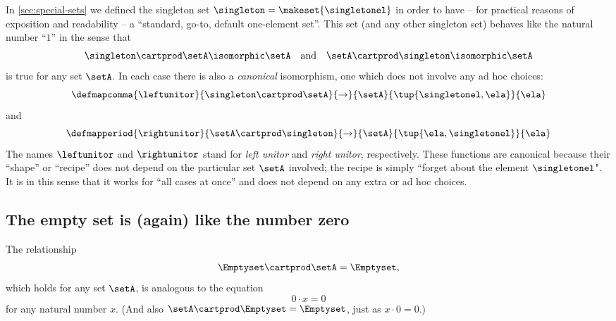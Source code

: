 In \cref{sec:special-sets} we defined the singleton set $\singleton = \makeset{\singletonel}$ in order to have -- for practical reasons of exposition and readability -- a ``standard, go-to, default one-element set''.
This set (and any other singleton set) behaves like the natural number ``$1$'' in the sense that
\begin{equation}\label{eq:singleton-set-is-neutral-for-prod}
    \singleton \cartprod \setA \isomorphic \setA \quad \text{and} \quad \setA \cartprod \singleton \isomorphic \setA
\end{equation}
is true for any set $\setA$. In each case there is also a \emph{canonical} isomorphism, one which does not involve any ad hoc choices:
\begin{equation}\label{eq:leftunitor-sets-prod}
    \defmapcomma{
        \leftunitor
    }{
        \singleton \cartprod \setA
    }{
        \to
    }{
        \setA
    }{
        \tup{\singletonel, \ela}
    }{
        \ela
    }
\end{equation}
and
\begin{equation}\label{eq:rightunitor-sets-prod}
    \defmapperiod{
        \rightunitor
    }{
        \setA \cartprod \singleton
    }{
        \to
    }{
        \setA
    }{
        \tup{\ela, \singletonel}
    }{
        \ela
    }
\end{equation}
The names $\leftunitor$ and $\rightunitor$ stand for \emph{left unitor} and \emph{right unitor}, respectively.
These functions are canonical because their ``shape'' or ``recipe'' does not depend on the particular set $\setA$ involved; the recipe is simply ``forget about the element $\singletonel$".
It is in this sense that it works for ``all cases at once'' and does not depend on any extra or ad hoc choices.


\subsection{The empty set is (again) like the number zero}

The relationship
\begin{equation}\label{eq:emptyset-is-zero}
    \Emptyset \cartprod \setA  = \Emptyset,
\end{equation}
which holds for any set $\setA$, is analogous to the equation
\begin{equation}
    0 \cdot x = 0
\end{equation}
for any natural number $x$. (And also $\setA \cartprod \Emptyset  = \Emptyset$, just as $x \cdot 0 = 0$.)


